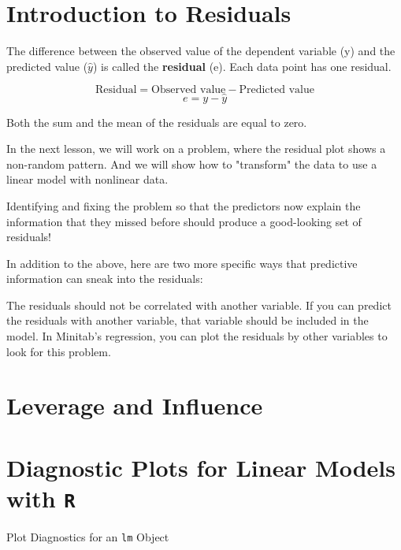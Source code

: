 

\section{Introduction to Residuals}

The difference between the observed value of the dependent variable (y) and the predicted value ($\hat{y}$) is called the \textbf{residual} (e). Each data point has one residual.

\[\mbox{Residual} = \mbox{Observed value} - \mbox{Predicted value}\] 
\[e = y - \hat{y}\]

Both the sum and the mean of the residuals are equal to zero. 


\newpage
		
In the next lesson, we will work on a problem, where the residual plot shows a non-random pattern. And we will show how to "transform" the data to use a linear model with nonlinear data.




Identifying and fixing the problem so that the predictors now explain the information that they missed before should produce a good-looking set of residuals!

In addition to the above, here are two more specific ways that predictive information can sneak into the residuals:

The residuals should not be correlated with another variable. If you can predict the residuals with another variable, that variable should be included in the model. In Minitab’s regression, you can plot the residuals by other variables to look for this problem.

\newpage
\section{Leverage and Influence}

\newpage
\section{Diagnostic Plots for Linear Models with \texttt{R}}
Plot Diagnostics for an \texttt{lm} Object


